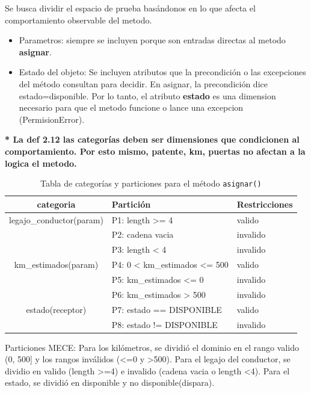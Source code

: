 Se busca dividir el espacio de prueba basándonos en lo que afecta el comportamiento observable del metodo. 
\begin{itemize}
    \item Parametros: siempre se incluyen porque son entradas directas al metodo \textbf{asignar}.
    \item Estado del objeto: Se incluyen atributos que la precondición o las excepciones del método consultan para decidir.
    \subitem En asignar, la precondición dice estado=disponible. Por lo tanto, el atributo \textbf{estado}  es una dimension necesario para que el metodo funcione o lance una excepcion (PermisionError).

\end{itemize}


\textbf{* La def 2.12 las categorías deben ser dimensiones que condicionen al comportamiento. Por esto mismo, patente, km, puertas no afectan a la logica el metodo.}

\begin{table}[ht]
    \centering
    \caption{Tabla de categorías y particiones para el método \texttt{asignar()}}
    \label{tab:casos_prueba}
    \begin{tabular}{|c|l|l|}
        \hline
        categoria & Partición & Restricciones \\ 
        \hline
        
        legajo\_conductor(param) & P1: length >= 4   & valido \\ 
        \hline
        & P2: cadena vacia   & invalido \\ 
        \hline
        & P3: length < 4   & invalido \\ 
        \hline

        km\_estimados(param) & P4: 0 < km\_estimados <= 500   & valido \\ 
        \hline
        & P5: km\_estimados <= 0   & invalido \\ 
        \hline
        & P6: km\_estimados > 500   & invalido \\ 
        \hline
                estado(receptor) & P7: estado == DISPONIBLE   & valido \\ 
        \hline
        & P8: estado != DISPONIBLE   & invalido \\ 
        \hline
    \end{tabular}
\end{table}


Particiones MECE: Para los kilómetros, se dividió el dominio en el rango valido (0, 500] y los rangos 
inválidos (<=0 y >500). Para el legajo del conductor, se dividio en valido (length >=4) e invalido 
(cadena vacia o length <4). Para el estado, se dividió en disponible y no disponible(dispara).



